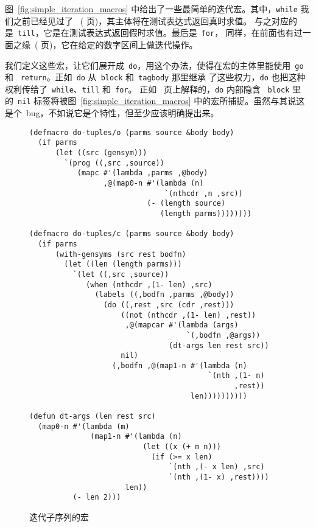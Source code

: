 图~\ref{fig:simple_iteration_macros} 中给出了一些最简单的迭代宏。其中，\texttt{while} 我们之前已经见过了
~(\pageref{macro:while} 页)，其主体将在测试表达式返回真时求值。
与之对应的是~\texttt{till}，它是在测试表达式返回假时求值。最后是~\texttt{for}，
同样，在前面也有过一面之缘~(\pageref{macro:for} 页)，它在给定的数字区间上做迭代操作。

我们定义这些宏，让它们展开成~\texttt{do}，用这个办法，使得在宏的主体里能使用~\texttt{go} 和
~\texttt{return}。正如~\texttt{do} 从~\texttt{block} 和~\texttt{tagbody} 那里继承
了这些权力，\verb|do| 也把这种权利传给了~\verb|while|、\verb|till| 和~\verb|for|。
正如~\pageref{block_and_capture} 页上解释的，\texttt{do} 内部隐含
~\texttt{block} 里的~\texttt{nil} 标签将被图~\ref{fig:simple_iteration_macros}
中的宏所捕捉。虽然与其说这是个~bug，不如说它是个特性，但至少应该明确提出来。

\begin{figure}
\begin{lstlisting}
(defmacro do-tuples/o (parms source &body body)
  (if parms
      (let ((src (gensym)))
        `(prog ((,src ,source))
           (mapc #'(lambda ,parms ,@body)
                 ,@(map0-n #'(lambda (n)
                               `(nthcdr ,n ,src))
                           (- (length source)
                              (length parms))))))))

(defmacro do-tuples/c (parms source &body body)
  (if parms
      (with-gensyms (src rest bodfn)
        (let ((len (length parms)))
          `(let ((,src ,source))
             (when (nthcdr ,(1- len) ,src)
               (labels ((,bodfn ,parms ,@body))
                 (do ((,rest ,src (cdr ,rest)))
                     ((not (nthcdr ,(1- len) ,rest))
                      ,@(mapcar #'(lambda (args)
                                    `(,bodfn ,@args))
                                (dt-args len rest src))
                     nil)
                   (,bodfn ,@(map1-n #'(lambda (n)
                                         `(nth ,(1- n)
                                               ,rest))
                                     len))))))))))

(defun dt-args (len rest src)
  (map0-n #'(lambda (m)
              (map1-n #'(lambda (n)
                          (let ((x (+ m n)))
                            (if (>= x len)
                                `(nth ,(- x len) ,src)
                                `(nth ,(1- x) ,rest))))
                      len))
          (- len 2)))
\end{lstlisting}
  \caption{迭代子序列的宏}
  \label{fig:macros_for_interation_by_subsequences}
\end{figure}

